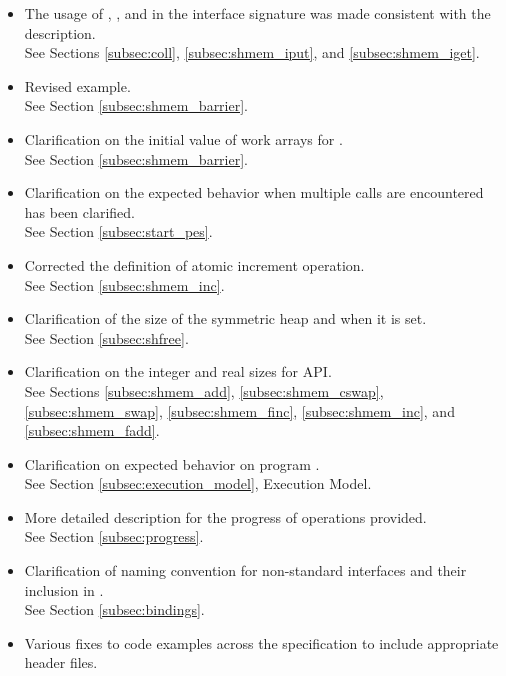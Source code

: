 \begin{itemize}
\item The usage of , , and  in the interface signature 
      was made consistent with the \cbstart description.\\See Sections \ref{subsec:coll}, \ref{subsec:shmem_iput}, and \ref{subsec:shmem_iget}.
\item Revised example.\\See Section \ref{subsec:shmem_barrier}. 
\item Clarification on the initial value of  work arrays for .\\ See Section \ref{subsec:shmem_barrier}. 
\item Clarification on the expected behavior when multiple  calls are encountered has been clarified.\\See Section \ref{subsec:start_pes}.
\item Corrected the definition of atomic increment operation.\\See Section \ref{subsec:shmem_inc}. 
\item Clarification of the size of the symmetric heap and when it is set.\\See Section \ref{subsec:shfree}.
\item Clarification on the integer and real sizes for \Fortran{} \ac{API}.\\See Sections \ref{subsec:shmem_add}, \ref{subsec:shmem_cswap}, \ref{subsec:shmem_swap}, \ref{subsec:shmem_finc}, \ref{subsec:shmem_inc}, and \ref{subsec:shmem_fadd}. 
\item Clarification on expected behavior on program .\\ See Section \ref{subsec:execution_model}, Execution Model. 
\item More detailed description for the progress of \openshmem operations provided.\\ See Section \ref{subsec:progress}. 
\item Clarification of naming convention for non-standard interfaces and their inclusion in .\\ See Section \ref{subsec:bindings}. 
\item Various fixes to \openshmem code examples across the specification to include appropriate header files. 

\end{itemize}
